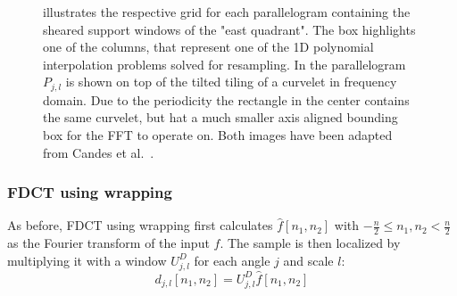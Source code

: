 \begin{figure}[h]
    \centering
    \quad
    \caption[Frequency tilings for USFFT and wrapping]{
         illustrates the respective grid for
        each parallelogram containing the sheared support windows of the "east
        quadrant". The box highlights one of the columns, that represent one of
        the 1D polynomial interpolation problems solved for resampling.
        In  the parallelogram $P_{j ,l}$
        is shown on top of the tilted tiling of a curvelet in frequency domain.
        Due to the periodicity the rectangle in the center contains the same
        curvelet, but hat a much smaller axis aligned bounding box for the FFT
        to operate on. Both images have been adapted from Candes et al.\ 
        \autocite{candes_fast_2006}.
    }
    \label{fig:curvelet_discrete_tilings}
\end{figure}

\subsubsection{FDCT using wrapping}

As before, FDCT using wrapping first calculates $\hat{f}[n_1, n_2]$ with
$-\frac{n}{2} \leq n_1, n_2 < \frac{n}{2}$ as the Fourier transform of the
input $f$. The sample is then localized by multiplying it with a window $U_{j,
l}^D$ for each angle $j$ and scale $l$:
\begin{equation*}
    d_{j, l}[n_1, n_2] = U_{j, l}^D \hat{f}[n_1, n_2]
\end{equation*}

